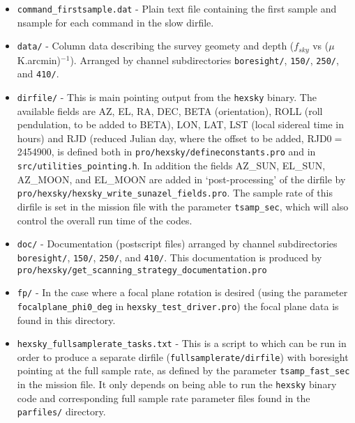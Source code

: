\documentclass[a4paper,10pt]{article}
\begin{document}
\begin{itemize}
\item \texttt{command\_firstsample.dat} - Plain text file containing
  the first sample and nsample for each command in the slow dirfile.

\item \texttt{data/} - Column data describing the survey geomety and
  depth ($f_{sky}$ vs ($\mu$K.arcmin)$^{-1}$). Arranged by channel subdirectories
  \texttt{boresight/}, \texttt{150/}, \texttt{250/}, and \texttt{410/}.



\item \texttt{dirfile/} - This is main pointing output from the
\texttt{hexsky} binary. The available fields are AZ, EL, RA, DEC, BETA
(orientation), ROLL (roll pendulation, to be added to BETA), LON, LAT,
LST (local sidereal time in hours) and RJD (reduced Julian day, where
the offset to be added, RJD0$=$2454900, is defined both in
\texttt{pro/hexsky/defineconstants.pro} and in
\texttt{src/utilities\_pointing.h}. In addition the fields AZ\_SUN,
EL\_SUN, AZ\_MOON, and EL\_MOON are added in `post-processing' of the dirfile
by \texttt{pro/hexsky/hexsky\_write\_sunazel\_fields.pro}. The
sample rate of this dirfile is set in the mission file with the
parameter \texttt{tsamp\_sec}, which will also control the overall run
time of the codes.

\item \texttt{doc/} - Documentation (postscript files) arranged by
  channel subdirectories \texttt{boresight/}, \texttt{150/},
  \texttt{250/}, and \texttt{410/}. This documentation is produced by
  \texttt{pro/hexsky/get\_scanning\_strategy\_documentation.pro}

\item \texttt{fp/} - In the case where a focal plane rotation is
  desired (using the parameter \texttt{focalplane\_phi0\_deg} in
  \texttt{hexsky\_test\_driver.pro}) the focal plane data is found in
  this directory.

\item \texttt{hexsky\_fullsamplerate\_tasks.txt} - This is a script to
which can be run in order to produce a separate dirfile
(\texttt{fullsamplerate/dirfile}) with boresight pointing at the full
sample rate, as defined by the parameter \texttt{tsamp\_fast\_sec} in
the mission file. It only depends on being able to run the
\texttt{hexsky} binary code and corresponding full sample rate
parameter files found in the \texttt{parfiles/} directory.


\end{itemize}
\end{document}
